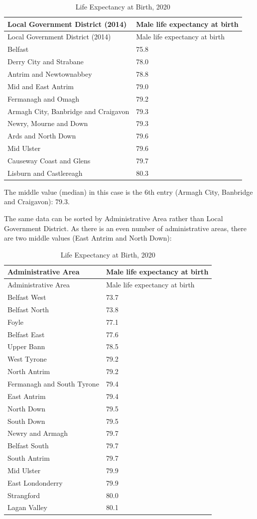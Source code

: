 \documentclass[
]{book}
\begin{document}
\begin{longtable}[]{@{}ll@{}}
\caption{\label{tab:table192} Life Expectancy at Birth, 2020}\tabularnewline
\toprule
Local Government District (2014) & Male life expectancy at birth \\
\midrule
\endfirsthead
\toprule
Local Government District (2014) & Male life expectancy at birth \\
\midrule
\endhead
Belfast & 75.8 \\
Derry City and Strabane & 78.0 \\
Antrim and Newtownabbey & 78.8 \\
Mid and East Antrim & 79.0 \\
Fermanagh and Omagh & 79.2 \\
Armagh City, Banbridge and Craigavon & 79.3 \\
Newry, Mourne and Down & 79.3 \\
Ards and North Down & 79.6 \\
Mid Ulster & 79.6 \\
Causeway Coast and Glens & 79.7 \\
Lisburn and Castlereagh & 80.3 \\
\bottomrule
\end{longtable}

The middle value (median) in this case is the 6th entry (Armagh City, Banbridge and Craigavon): 79.3.

The same data can be sorted by Administrative Area rather than Local Government District. As there is an even number of administrative areas, there are two middle values (East Antrim and North Down):

\begin{longtable}[]{@{}ll@{}}
\caption{\label{tab:table193} Life Expectancy at Birth, 2020}\tabularnewline
\toprule
Administrative Area & Male life expectancy at birth \\
\midrule
\endfirsthead
\toprule
Administrative Area & Male life expectancy at birth \\
\midrule
\endhead
Belfast West & 73.7 \\
Belfast North & 73.8 \\
Foyle & 77.1 \\
Belfast East & 77.6 \\
Upper Bann & 78.5 \\
West Tyrone & 79.2 \\
North Antrim & 79.2 \\
Fermanagh and South Tyrone & 79.4 \\
East Antrim & 79.4 \\
North Down & 79.5 \\
South Down & 79.5 \\
Newry and Armagh & 79.7 \\
Belfast South & 79.7 \\
South Antrim & 79.7 \\
Mid Ulster & 79.9 \\
East Londonderry & 79.9 \\
Strangford & 80.0 \\
Lagan Valley & 80.1 \\
\bottomrule
\end{longtable}
\end{document}
